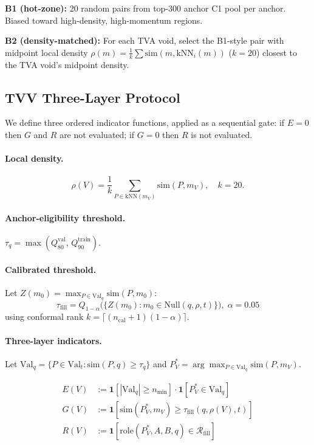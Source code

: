 \documentclass[11pt,twocolumn]{article}
\newcommand{\tva}{\textsf{TVA}}
\newcommand{\valq}{\mathrm{Val}_{q}}
\newcommand{\taufill}{\tau_{\mathrm{fill}}}
\newcommand{\tauanchor}{\tau_{q}}
\begin{document}
\textbf{B1 (hot-zone):} 20 random pairs from top-300 anchor C1 pool per anchor.
Biased toward high-density, high-momentum regions.

\textbf{B2 (density-matched):} For each \tva{} void, select the B1-style pair with
midpoint local density $\rho(m) = \frac{1}{k}\sum \mathrm{sim}(m, \mathrm{kNN}_i(m))$
($k=20$) closest to the \tva{} void's midpoint density.

\subsection{TVV Three-Layer Protocol}

We define three ordered indicator functions, applied as a sequential gate:
if $E=0$ then $G$ and $R$ are not evaluated; if $G=0$ then $R$ is not evaluated.

\paragraph{Local density.}
\[\rho(V) = \frac{1}{k}\sum_{P \in \mathrm{kNN}(m_V)} \mathrm{sim}(P,m_V),\quad k{=}20.\]

\paragraph{Anchor-eligibility threshold.}
$\tauanchor = \max(Q_{80}^{\mathrm{val}},\, Q_{90}^{\mathrm{train}})$.

\paragraph{Calibrated threshold.} Let $Z(m_0)=\max_{P\in\valq}\mathrm{sim}(P,m_0)$:
\[
\taufill = Q_{1-\alpha}\!\bigl(\{Z(m_0): m_0{\in}\mathrm{Null}(q,\rho,t)\}\bigr),\;
\alpha{=}0.05
\]
using conformal rank $k{=}\lceil(n_\mathrm{cal}{+}1)(1{-}\alpha)\rceil$.

\paragraph{Three-layer indicators.}
Let $\valq = \{P \in \mathrm{Val}_t : \mathrm{sim}(P,q) \ge \tauanchor\}$ and
$P_V^* = \arg\max_{P \in \valq} \mathrm{sim}(P, m_V)$.

\begin{align}
E(V) &:= \mathbf{1}[|\valq| \ge n_{\min}]\cdot\mathbf{1}[P_V^* \in \valq]
         \tag{E} \\
G(V) &:= \mathbf{1}[\mathrm{sim}(P_V^*, m_V) \ge \taufill(q,\rho(V),t)]
         \tag{G} \\
R(V) &:= \mathbf{1}[\mathrm{role}(P_V^*,A,B,q) \in \mathcal{R}_\mathrm{fill}]
         \tag{R}
\end{align}
\end{document}
